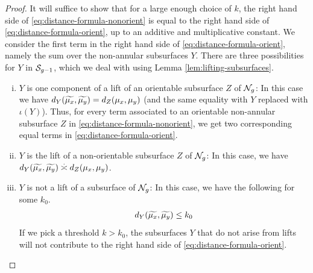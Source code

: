 \documentclass[12pt, reqno]{amsart}
\begin{document}
\begin{proof}
 It will suffice to show that for a large enough choice of $k$, the right hand side of \eqref{eq:distance-formula-nonorient} is equal to the right hand side of \eqref{eq:distance-formula-orient}, up to an additive and multiplicative constant.
 We consider the first term in the right hand side of \eqref{eq:distance-formula-orient}, namely the sum over the non-annular subsurfaces $Y$.
 There are three possibilities for $Y$ in $\mathcal{S}_{g-1}$, which we deal with using Lemma \ref{lem:lifting-subsurfaces}.
 \begin{enumerate}[(i)]
 \item $Y$ is one component of a lift of an orientable subsurface $Z$ of $\mathcal{N}_g$: In this case we have $d_Y(\widetilde{\mu_x}, \widetilde{\mu_y}) = d_Z(\mu_x, \mu_y)$ (and the same equality with $Y$ replaced with $\iota(Y)$).
   Thus, for every term associated to an orientable non-annular subsurface $Z$ in \eqref{eq:distance-formula-nonorient}, we get two corresponding equal terms in \eqref{eq:distance-formula-orient}.
 \item $Y$ is the lift of a non-orientable subsurface $Z$ of $\mathcal{N}_g$: In this case, we have $d_Y(\wt{\mu_x}, \wt{\mu_y}) \emul d_Z(\mu_x, \mu_y)$.
 \item $Y$ is not a lift of a subsurface of $\mathcal{N}_g$: In this case, we have the following for some $k_0$.
   \begin{align*}
     d_Y(\widetilde{\mu_x}, \widetilde{\mu_y}) \leq k_0
   \end{align*}
   If we pick a threshold $k > k_0$, the subsurfaces $Y$ that do not arise from lifts will not contribute to the right hand side of \eqref{eq:distance-formula-orient}.
 \end{enumerate}


\end{proof}
\end{document}
